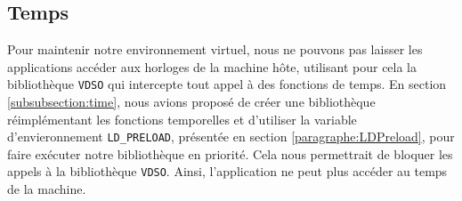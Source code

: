 \subsection{Temps}
Pour maintenir notre environnement virtuel, nous ne pouvons pas laisser les applications accéder aux horloges de la machine hôte, utilisant pour cela la bibliothèque \texttt{VDSO} qui intercepte tout appel à des fonctions de temps. En section \ref{subsubsection:time}, nous avions proposé de créer une bibliothèque réimplémentant les fonctions temporelles et d'utiliser la variable d'envieronnement \texttt{LD\_PRELOAD}, présentée en section \ref{paragraphe:LDPreload}, pour faire exécuter notre bibliothèque en priorité. Cela nous permettrait de bloquer les appels à la bibliothèque \texttt{VDSO}. Ainsi, l'application ne peut plus accéder au temps de la machine.

